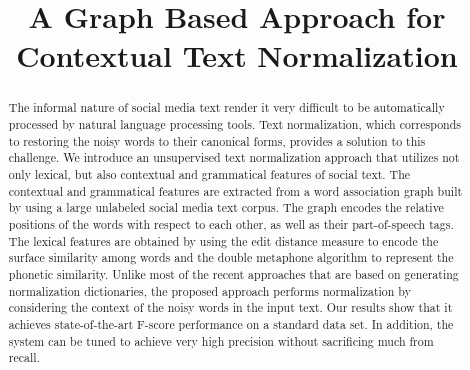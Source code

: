 \documentclass[preprint,review,12pt]{elsarticle}
\begin{document}
\begin{frontmatter}



\title{A Graph Based Approach for Contextual Text Normalization}


\author{}

\address{}

\begin{abstract}

The informal nature of social media text render it very difficult to be automatically processed by natural language processing tools. Text normalization, which corresponds to restoring the noisy words to their canonical forms, provides a solution to this challenge.
We introduce an unsupervised text normalization approach that utilizes not only lexical, but also contextual and grammatical features of social text.
The contextual and grammatical features are extracted from a word association graph built by using a large unlabeled social media text corpus.
The graph encodes the relative positions of the words with respect to each other, as well as their part-of-speech tags.
The lexical features are obtained by using the edit distance measure to encode the surface similarity among words and the double metaphone algorithm to represent the phonetic similarity. Unlike most of the recent approaches that are based on generating normalization dictionaries, the proposed approach performs normalization by considering the context of the noisy words in the input text.
Our results show that it achieves state-of-the-art F-score performance on a standard data set. In addition, the system can be tuned to achieve very high precision without sacrificing much from recall.


\end{abstract}
\end{frontmatter}
\end{document}
